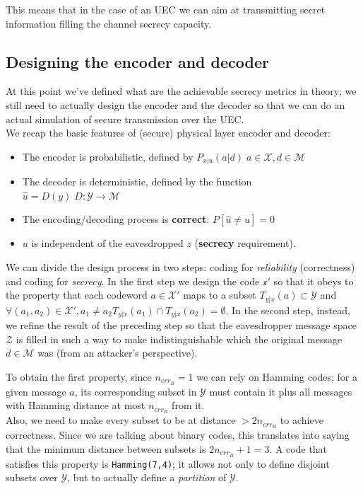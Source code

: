 \documentclass[a4paper,12pt,titlepage]{article}
\begin{document}
This means that in the case of an UEC we can aim at transmitting secret
information filling the channel secrecy capacity.

\subsection*{Designing the encoder and decoder}
At this point we've defined what are the achievable secrecy metrics in theory;
we still need to actually design the encoder and the decoder so that we can do
an actual simulation of secure transmission over the UEC. \\
We recap the basic features of (secure) physical layer encoder and decoder:
\begin{itemize}
  \item The encoder is probabilistic, defined by $P_{x|u}(a|d) \; a \in
  \mathcal{X}, d \in \mathcal{M}$
  \item The decoder is deterministic, defined by the function \\
  $\hat{u} = D(y) \; D: \mathcal{Y} \rightarrow \mathcal{M}$
  \item The encoding/decoding process is \textbf{correct}: $P[\hat{u} \neq u] =
  0$
  \item $u$ is independent of the eavesdropped $z$ (\textbf{secrecy}
  requirement).
\end{itemize}

We can divide the design process in two steps: coding for \emph{reliability}
(correctness) and coding for \emph{secrecy}. In the first step we design the
code $\mathcal{x'}$ so that it obeys to the property that each codeword $a \in \mathcal{X'}$
maps to a subset $T_{y|x}(a) \subset \mathcal{Y}$ and $\forall (a_1, a_2) \in
\mathcal{X'}, a_1 \neq a_2 T_{y|x}(a_1) \cap T_{y|x}(a_2) = \emptyset$. In the
second step, instead, we refine the result of the preceding step so that the
eavesdropper message space $\mathcal{Z}$ is filled in such a way to make
indistinguishable which the original message $d \in \mathcal{M}$ was (from an
attacker's perspective).

To obtain the first property, since $n_{err_B} = 1$ we can rely on Hamming codes;
for a given message
$a$, its corresponding subset in $\mathcal{Y}$ must contain it plus all
messages with Hamming distance at most $n_{err_B}$ from it. \\
Also, we need to make every subset to be at distance $> 2n_{err_B}$ to achieve
correctness. Since we are talking about binary codes, this translates into
saying that the minimum distance between subsets is $2n_{err_B} + 1 = 3$.
A code that satisfies this property is \texttt{Hamming(7,4)}; it allows not
only to define disjoint subsets over $\mathcal{Y}$, but to actually define a
\emph{partition} of $\mathcal{Y}$.
\end{document}
